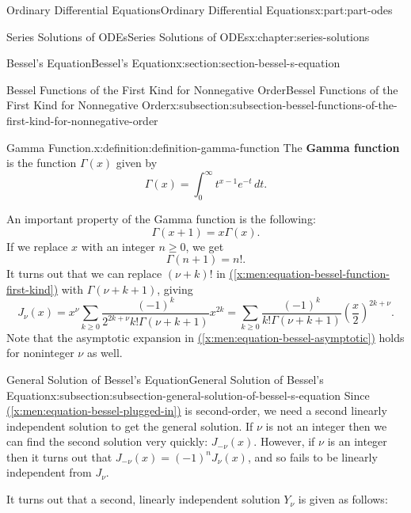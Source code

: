 \documentclass[oneside,10pt,]{book}
\newcommand{\xreffont}{\relax}
\newcommand{\terminology}[1]{\textbf{#1}}
\numberwithin{equation}{part}
\begin{document}
\begin{partptx}{Ordinary Differential Equations}{}{Ordinary Differential Equations}{}{}{x:part:part-odes}
\begin{chapterptx}{Series Solutions of ODEs}{}{Series Solutions of ODEs}{}{}{x:chapter:series-solutions}
\begin{sectionptx}{Bessel's Equation}{}{Bessel's Equation}{}{}{x:section:section-bessel-s-equation}
\begin{subsectionptx}{Bessel Functions of the First Kind for Nonnegative Order}{}{Bessel Functions of the First Kind for Nonnegative Order}{}{}{x:subsection:subsection-bessel-functions-of-the-first-kind-for-nonnegative-order}
\begin{definition}{Gamma Function.}{x:definition:definition-gamma-function}%
%
The \terminology{Gamma function} is the function \(\Gamma(x)\) given by%
\begin{equation*}
\Gamma(x) = \int_{0}^{\infty}t^{x-1}e^{-t}\,dt\text{.}
\end{equation*}
%
\end{definition}
An important property of the Gamma function is the following:%
\begin{equation*}
\Gamma(x + 1) = x\Gamma(x)\text{.}
\end{equation*}
If we replace \(x\) with an integer \(n\geq0\), we get%
\begin{equation*}
\Gamma(n + 1) = n!\text{.}
\end{equation*}
It turns out that we can replace \((\nu + k)!\) in \hyperref[x:men:equation-bessel-function-first-kind]{({\xreffont\ref{x:men:equation-bessel-function-first-kind}})} with \(\Gamma(\nu + k + 1)\), giving%
\begin{equation}
J_{\nu}(x) = x^{\nu}\sum_{k\geq0}\frac{(-1)^{k}}{2^{2k + \nu}k!\Gamma(\nu + k + 1)}x^{2k} = \sum_{k\geq0} \frac{(-1)^{k}}{k!\Gamma(\nu + k + 1)}\left(\frac{x}{2}\right)^{2k + \nu}\text{.}\label{x:men:equation-bessel-first-kind-nonnegative-order}
\end{equation}
Note that the asymptotic expansion in \hyperref[x:men:equation-bessel-asymptotic]{({\xreffont\ref{x:men:equation-bessel-asymptotic}})} holds for noninteger \(\nu\) as well.%
\end{subsectionptx}
%
%
\typeout{************************************************}
\typeout{************************************************}
%
\begin{subsectionptx}{General Solution of Bessel's Equation}{}{General Solution of Bessel's Equation}{}{}{x:subsection:subsection-general-solution-of-bessel-s-equation}
Since \hyperref[x:men:equation-bessel-plugged-in]{({\xreffont\ref{x:men:equation-bessel-plugged-in}})} is second-order, we need a second linearly independent solution to get the general solution. If \(\nu\) is not an integer then we can find the second solution very quickly: \(J_{-\nu}(x)\). However, if \(\nu\) is an integer then it turns out that \(J_{-\nu}(x) = (-1)^{n}J_{\nu}(x)\), and so fails to be linearly independent from \(J_{\nu}\).%
\par
It turns out that a second, linearly independent solution \(Y_{\nu}\) is given as follows:%

\end{subsectionptx}
\end{sectionptx}
\end{chapterptx}
\end{partptx}
\end{document}
